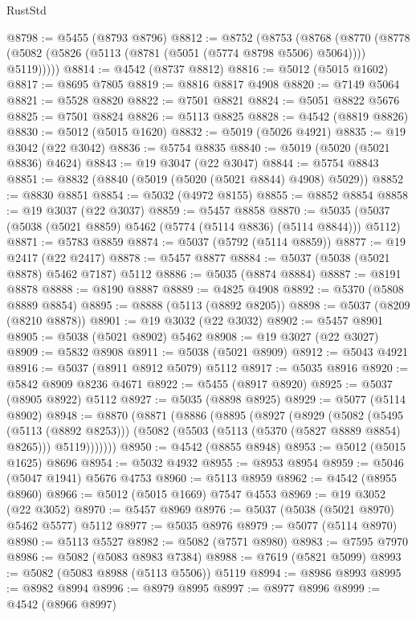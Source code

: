 \begin{lexlean}{RustStd}
\begin{coremodule}
@8798 := @5455 (@8793 @8796)
@8812 := @8752
    (@8753
      (@8768
        (@8770 (@8778 (@5082 (@5826 (@5113 (@8781 (@5051 (@5774 @8798 @5506) @5064)))) @5119)))))
@8814 := @4542 (@8737 @8812)
@8816 := @5012 (@5015 @1602)
@8817 := @8695 @7805
@8819 := @8816 @8817 @4908
@8820 := @7149 @5064
@8821 := @5528 @8820
@8822 := @7501 @8821
@8824 := @5051 @8822 @5676
@8825 := @7501 @8824
@8826 := @5113 @8825
@8828 := @4542 (@8819 @8826)
@8830 := @5012 (@5015 @1620)
@8832 := @5019 (@5026 @4921)
@8835 := @19 @3042 (@22 @3042)
@8836 := @5754 @8835
@8840 := @5019 (@5020 (@5021 @8836) @4624)
@8843 := @19 @3047 (@22 @3047)
@8844 := @5754 @8843
@8851 := @8832 (@8840 (@5019 (@5020 (@5021 @8844) @4908) @5029))
@8852 := @8830 @8851
@8854 := @5032 (@4972 @8155)
@8855 := @8852 @8854
@8858 := @19 @3037 (@22 @3037)
@8859 := @5457 @8858
@8870 := @5035 (@5037 (@5038 (@5021 @8859) @5462 (@5774 (@5114 @8836) (@5114 @8844))) @5112)
@8871 := @5783 @8859
@8874 := @5037 (@5792 (@5114 @8859))
@8877 := @19 @2417 (@22 @2417)
@8878 := @5457 @8877
@8884 := @5037 (@5038 (@5021 @8878) @5462 @7187) @5112
@8886 := @5035 (@8874 @8884)
@8887 := @8191 @8878
@8888 := @8190 @8887
@8889 := @4825 @4908
@8892 := @5370 (@5808 @8889 @8854)
@8895 := @8888 (@5113 (@8892 @8205))
@8898 := @5037 (@8209 (@8210 @8878))
@8901 := @19 @3032 (@22 @3032)
@8902 := @5457 @8901
@8905 := @5038 (@5021 @8902) @5462
@8908 := @19 @3027 (@22 @3027)
@8909 := @5832 @8908
@8911 := @5038 (@5021 @8909)
@8912 := @5043 @4921
@8916 := @5037 (@8911 @8912 @5079) @5112
@8917 := @5035 @8916
@8920 := @5842 @8909 @8236 @4671
@8922 := @5455 (@8917 @8920)
@8925 := @5037 (@8905 @8922) @5112
@8927 := @5035 (@8898 @8925)
@8929 := @5077 (@5114 @8902)
@8948 := @8870
    (@8871
      (@8886
        (@8895
          (@8927
            (@8929
              (@5082
                (@5495 (@5113 (@8892 @8253)))
                (@5082 (@5503 (@5113 (@5370 (@5827 @8889 @8854) @8265))) @5119)))))))
@8950 := @4542 (@8855 @8948)
@8953 := @5012 (@5015 @1625) @8696
@8954 := @5032 @4932
@8955 := @8953 @8954
@8959 := @5046 (@5047 @1941) @5676 @4753
@8960 := @5113 @8959
@8962 := @4542 (@8955 @8960)
@8966 := @5012 (@5015 @1669) @7547 @4553
@8969 := @19 @3052 (@22 @3052)
@8970 := @5457 @8969
@8976 := @5037 (@5038 (@5021 @8970) @5462 @5577) @5112
@8977 := @5035 @8976
@8979 := @5077 (@5114 @8970)
@8980 := @5113 @5527
@8982 := @5082 (@7571 @8980)
@8983 := @7595 @7970
@8986 := @5082 (@5083 @8983 @7384)
@8988 := @7619 (@5821 @5099)
@8993 := @5082 (@5083 @8988 (@5113 @5506)) @5119
@8994 := @8986 @8993
@8995 := @8982 @8994
@8996 := @8979 @8995
@8997 := @8977 @8996
@8999 := @4542 (@8966 @8997)

\end{coremodule}
\end{lexlean}
